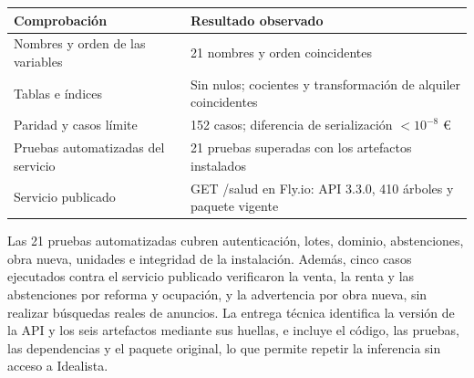 \documentclass[11pt,a4paper]{article}
\newcommand{\thead}[1]{\textbf{#1}}
\begin{document}
\begin{center}
\begin{tabularx}{\linewidth}{@{}L L@{}}
\toprule
\thead{Comprobación} & \thead{Resultado observado} \\
\midrule
Nombres y orden de las variables & 21 nombres y orden coincidentes \\
Tablas e índices & Sin nulos; cocientes y transformación de alquiler coincidentes \\
Paridad y casos límite & 152 casos; diferencia de serialización $<10^{-8}$ € \\
Pruebas automatizadas del servicio & 21 pruebas superadas con los artefactos instalados \\
Servicio publicado & GET /salud en Fly.io: API 3.3.0, 410 árboles y paquete vigente \\
\bottomrule
\end{tabularx}
\end{center}

Las 21 pruebas automatizadas cubren autenticación, lotes, dominio, abstenciones, obra nueva, unidades e integridad de la instalación. Además, cinco casos ejecutados contra el servicio publicado verificaron la venta, la renta y las abstenciones por reforma y ocupación, y la advertencia por obra nueva, sin realizar búsquedas reales de anuncios. La entrega técnica identifica la versión de la API y los seis artefactos mediante sus huellas, e incluye el código, las pruebas, las dependencias y el paquete original, lo que permite repetir la inferencia sin acceso a Idealista.
\end{document}

